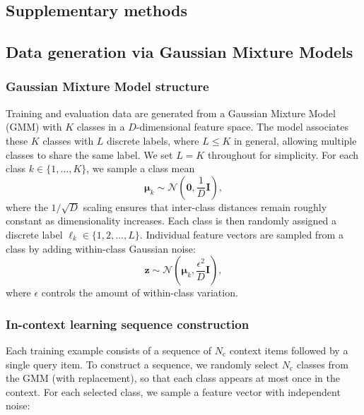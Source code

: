 \documentclass[%
reprint,
superscriptaddress,
amsmath,amssymb,
aps,
]{revtex4-2}
\newcommand{\bz}{\mathbf{z}}       %
\newcommand{\bmu}{\boldsymbol{\mu}}       %
\begin{document}
	
	\begin{onecolumngrid}
		
		
		
		\section{Supplementary methods}
		\subsection{Data generation via Gaussian Mixture Models}\label{SIsec:GMM}
		
		\subsubsection{Gaussian Mixture Model structure}
		Training and evaluation data are generated from a Gaussian Mixture Model (GMM) with $K$ classes in a $D$-dimensional feature space. The model associates these $K$ classes with $L$ discrete labels, where $L \leq K$ in general, allowing multiple classes to share the same label.  We set $L=K$ throughout for simplicity.  For each class $k \in \{1, \ldots, K\}$, we sample a class mean
		\begin{equation}
			\bmu_k \sim \mathcal{N}\left(\mathbf{0}, \frac{1}{D}\mathbf{I}\right),
		\end{equation}
		where the $1/\sqrt{D}$ scaling ensures that inter-class distances remain roughly constant as dimensionality increases. Each class is then randomly assigned a discrete label $\ell_k \in \{1, 2, \ldots, L\}$. Individual feature vectors are sampled from a class by adding within-class Gaussian noise:
		\begin{equation}
			\bz \sim \mathcal{N}\left(\bmu_k, \frac{\epsilon^2}{D}\mathbf{I}\right),
		\end{equation}
		where $\epsilon$ controls the amount of within-class variation.
		
		\subsubsection{In-context learning sequence construction}
		Each training example consists of a sequence of $N_\text{c}$ context items followed by a single query item. To construct a sequence, we randomly select $N_\text{c}$ classes from the GMM (with replacement), so that each class appears at most once in the context. For each selected class, we sample a feature vector with independent noise:
		

\end{onecolumngrid}
\end{document}
